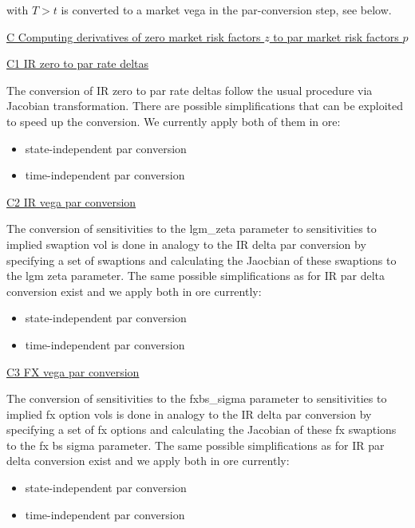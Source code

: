 with $T>t$ is converted to a market vega in the par-conversion step, see below.


\underline{C Computing derivatives of zero market risk factors $z$ to par market risk factors $p$}

\underline{C1 IR zero to par rate deltas}

The conversion of IR zero to par rate deltas follow the usual procedure via Jacobian transformation. There are possible simplifications that can be exploited to speed up the conversion. We currently apply both of them in ore:

\begin{itemize}
\item state-independent par conversion
\item time-independent par conversion
\end{itemize}

\underline{C2 IR vega par conversion}

The conversion of sensitivities to the lgm\_zeta parameter to sensitivities to implied swaption vol is done in analogy
to the IR delta par conversion by specifying a set of swaptions and calculating the Jaocbian of these swaptions to the
lgm zeta parameter. The same possible simplifications as for IR par delta conversion exist and we apply both in ore
currently:

\begin{itemize}
\item state-independent par conversion
\item time-independent par conversion
\end{itemize}

\underline{C3 FX vega par conversion}

The conversion of sensitivities to the fxbs\_sigma parameter to sensitivities to implied fx option vols is done in
analogy to the IR delta par conversion by specifying a set of fx options and calculating the Jacobian of these fx
swaptions to the fx bs sigma parameter. The same possible simplifications as for IR par delta conversion exist and we
apply both in ore currently:

\begin{itemize}
\item state-independent par conversion
\item time-independent par conversion
\end{itemize}
